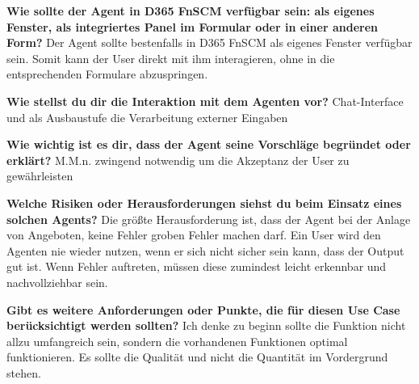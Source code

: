 \textbf{Wie sollte der Agent in D365 FnSCM verfügbar sein: als eigenes Fenster, als integriertes Panel im Formular oder in einer anderen Form?}\newline
Der Agent sollte bestenfalls in D365 FnSCM als eigenes Fenster verfügbar sein. Somit kann der User direkt mit ihm interagieren, ohne in die entsprechenden Formulare abzuspringen.

\textbf{Wie stellst du dir die Interaktion mit dem Agenten vor?}\newline
Chat-Interface und als Ausbaustufe die Verarbeitung externer Eingaben

\textbf{Wie wichtig ist es dir, dass der Agent seine Vorschläge begründet oder erklärt?}\newline
M.M.n. zwingend notwendig um die Akzeptanz der User zu gewährleisten

\textbf{Welche Risiken oder Herausforderungen siehst du beim Einsatz eines solchen Agents?}\newline
Die größte Herausforderung ist, dass der Agent bei der Anlage von Angeboten, keine Fehler groben Fehler machen darf. Ein User wird den Agenten nie wieder nutzen, wenn er sich nicht sicher sein kann, dass der Output gut ist. Wenn Fehler auftreten, müssen diese zumindest leicht erkennbar und nachvollziehbar sein.

\textbf{Gibt es weitere Anforderungen oder Punkte, die für diesen Use Case berücksichtigt werden sollten?}\newline
Ich denke zu beginn sollte die Funktion nicht allzu umfangreich sein, sondern die
vorhandenen Funktionen optimal funktionieren. Es sollte die Qualität und nicht die
Quantität im Vordergrund stehen.
\newpage
